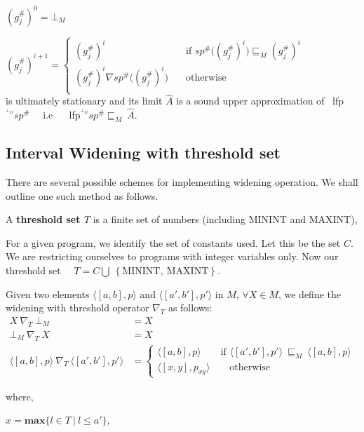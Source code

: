 \documentclass[final,3p, review, times]{util/elsarticle}
\begin{document}
$(g^\#_j)^0=\bot_M$

$(g^\#_j)^{i+1} =
  \begin{cases}
    (g^\#_j)^i       & \quad \text{if } sp^\#\Big((g^\#_j)^i\Big)\sqsubseteq_M (g^\#_j)^i\\
    (g^\#_j)^i\nabla sp^\#\Big((g^\#_j)^i\Big)  & \quad \text{otherwise}\\
  \end{cases}
$\\

is ultimately stationary and its limit $\hat{A}$ is a sound upper approximation of \ lfp$^{^{\bot_M}}sp^\#\quad$ i.e $\quad$ lfp$^{^{\bot_M}}sp^\#\sqsubseteq_M\ \hat{A}$.

\subsection{Interval Widening with threshold set}

There are several possible schemes for implementing widening operation. We shall outline one such method as follows.

A \textbf{threshold set $T$} is a finite set of numbers (including $\mathrm{MININT}$ and $\mathrm{MAXINT}$),

For a given program, we identify the set of constants used. Let this
be the set $C$. We are restricting ourselves to programs with integer variables only. Now our threshold set $\quad T=C\bigcup\ \left\{\mathrm{MININT},\  \mathrm{MAXINT}\right\}$.

Given two elements $\langle[a,b], p\rangle$ and $\langle[a',b'], p'\rangle$ in $M$, $\forall X\in M$, we define the widening with threshold operator $\nabla_T$ as follows:
\begin{subequations}
  \begin{align}
    X\ \nabla_T\ \bot_M&=X\\
    \bot_M\ \nabla_T\ X&=X\\
    \langle[a,b], p\rangle\ \nabla_T\ \langle[a',b'], p'\rangle&=
    \begin{cases}
      \langle[a,b], p\rangle\qquad\text{if } \langle[a',b'], p'\rangle\ \sqsubseteq_M\ \langle[a,b], p\rangle\\
      \langle[x,y], p_{xy}\rangle\qquad\text{otherwise}
    \end{cases}
  \end{align}
\end{subequations}

where,

$x=\mathbf{max}\{l\in T\ |\ l\leq a'\}$,
\end{document}
